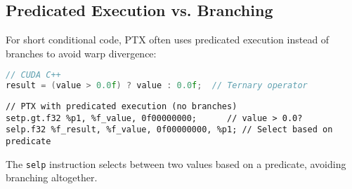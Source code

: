 \subsection{Predicated Execution vs. Branching}

For short conditional code, PTX often uses predicated execution instead of branches to avoid warp divergence:

\begin{lstlisting}[language=C++]
// CUDA C++
result = (value > 0.0f) ? value : 0.0f;  // Ternary operator
\end{lstlisting}

\begin{lstlisting}[style=ptx]
// PTX with predicated execution (no branches)
setp.gt.f32 %p1, %f_value, 0f00000000;      // value > 0.0?
selp.f32 %f_result, %f_value, 0f00000000, %p1; // Select based on predicate
\end{lstlisting}

The \texttt{selp} instruction selects between two values based on a predicate, avoiding branching altogether.

